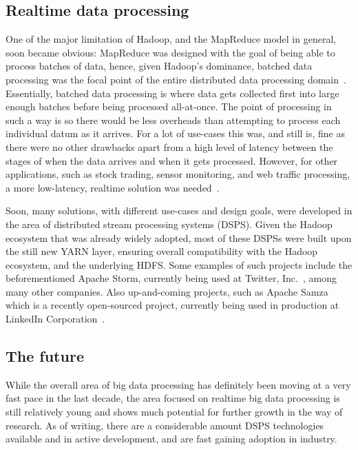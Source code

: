 \documentclass[a4paper,11pt]{article}
\begin{document}

\subsection{Realtime data processing} %
\label{sub:realtime_data_processing}

One of the major limitation of Hadoop, and the MapReduce model in general, soon became obvious: MapReduce was designed
with the goal of being able to process batches of data, hence, given Hadoop's dominance, batched data processing was the
focal point of the entire distributed data processing domain~\cite{kamburugamuve_survey_2014}. Essentially, batched data
processing is where data gets collected first into large enough batches before being processed all-at-once. The point of
processing in such a way is so there would be less overheads than attempting to process each individual datum as it
arrives. For a lot of use-cases this was, and still is, fine as there were no other drawbacks apart from a high level of
latency between the stages of when the data arrives and when it gets processed. However, for other applications, such as
stock trading, sensor monitoring, and web traffic processing, a more low-latency, realtime solution was
needed~\cite{kamburugamuve_survey_2014}.

Soon, many solutions, with different use-cases and design goals, were developed in the area of distributed stream
processing systems (DSPS). Given the Hadoop ecosystem that was already widely adopted, most of these DSPSs were built
upon the still new YARN layer, ensuring overall compatibility with the Hadoop ecosystem, and the underlying HDFS. Some
examples of such projects include the beforementioned Apache Storm, currently being used at Twitter,
Inc.~\cite{toshniwal_stormtwitter_2014}, among many other companies. Also up-and-coming projects, such as Apache Samza
which is a recently open-sourced project, currently being used in production at LinkedIn Corporation~\cite{web:Samza}.


\subsection{The future} %
\label{sub:the_future}

While the overall area of big data processing has definitely been moving at a very fast pace in the last decade, the
area focused on realtime big data processing is still relatively young and shows much potential for further growth in
the way of research. As of writing, there are a considerable amount DSPS technologies available and in active
development, and are fast gaining adoption in industry.
\end{document}
